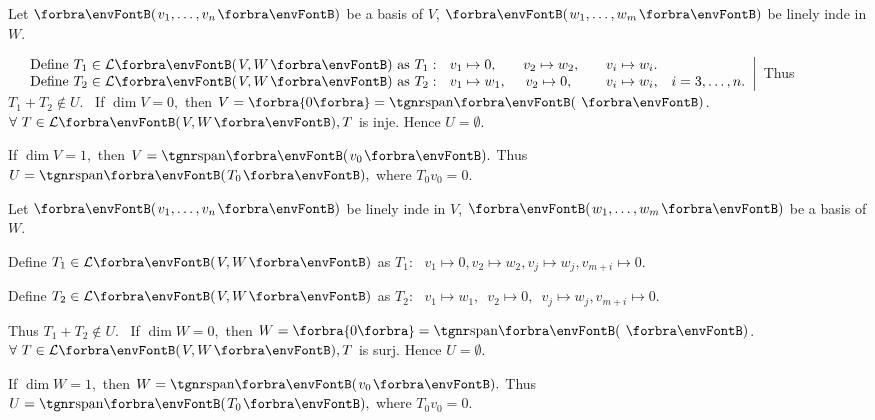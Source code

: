 \documentclass[a4paper, 11pt, UTF8]{article}
\begin{document}
\begin{large}
\par\quad
Let $\Par{v_1,\dots,v_n}$ be a basis of $V$, $\Par{w_1,\dots,w_m}$ be linely inde in $W$. \par\,
$\MathRightMid{l}{$
Define $T_1\in\Lm{V,W}$ as $T_1:\,\,\,\,v_1\mapsto 0,$\qquad$v_2\mapsto w_2,$\qquad$v_i\mapsto w_i$.$\\$
Define $T_2\in\Lm{V,W}$ as $T_2:\,\,\,\,v_1\mapsto w_1,$ \quad\,$v_2\mapsto 0,$\,\,\,\qquad$v_i\mapsto w_i$,\quad $i=3,\dots,n.}$ Thus $T_1+T_2\not\in U.$\PfEnd\vspace{6pt}
\Comment \,\,\,If $\dim V=0,$ then $V=\zeroSubs=\Span{\,}$. $\forall\,\,T\in\Lm{V,W}, T$ is inje. Hence $U=\emptyset$.\par
\Blind{\Comment\,\,\,}If $\dim V=1,$ then $V=\Span{v_0}.$ Thus $U=\Span{T_0},$ where $T_0 v_0=0.$\par
\SepLine

\par\quad
Let $\Par{v_1,\dots,v_n}$ be linely inde in $V$, $\Par{w_1,\dots,w_m}$ be a basis of $W$. \par\quad
Define $T_1\in\Lm{V,W}$ as $T_1:\,\,\,\,v_1\mapsto 0,$\qquad$v_2\mapsto w_2,$\qquad$v_j\mapsto w_j,$\qquad$v_{m+i}\mapsto 0.$\par\quad
Define $T_2\in\Lm{V,W}$ as $T_2:\,\,\,\,v_1\mapsto w_1,$\,\,\,\quad$v_2\mapsto 0,$\,\,\,\qquad$v_j\mapsto w_j,$\qquad$v_{m+i}\mapsto 0.$\par\quad
{} Thus $T_1+T_2\not\in U.$\PfEnd\vspace{6pt}
\Comment \,\,\,If $\dim W=0,$ then $W=\zeroSubs=\Span{\,}$. $\forall\,\,T\in\Lm{V,W}, T$ is surj. Hence $U=\emptyset.$\par
\Blind{\Comment\,\,\,}If $\dim W=1,$ then $W=\Span{v_0}.$ Thus $U=\Span{T_0},$ where $T_0 v_0=0.$\par
\SepLine


\end{large}
\end{document}
